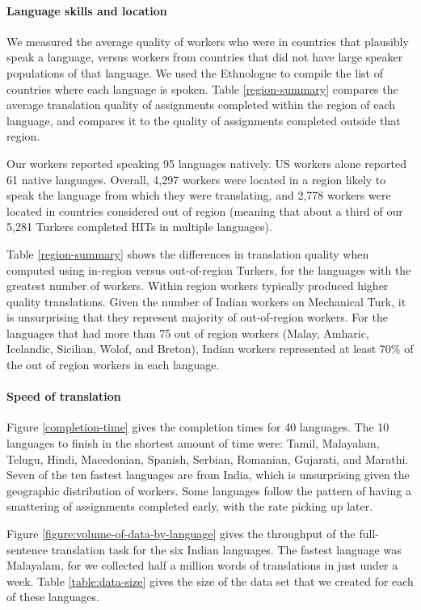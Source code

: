 \documentclass[11pt]{article}
\begin{document}
\paragraph{Language skills and location}

We measured the average quality of workers who were in countries that plausibly speak a language, versus workers from countries that did not have large speaker populations of that language.  We used the Ethnologue \cite{ethnologue} to compile the list of countries where each language is spoken.  Table \ref{region-summary} compares the average translation quality of assignments completed within the region of each language, and compares it to the quality of assignments completed outside that region. 

Our workers reported speaking 95 languages natively. US workers alone reported 61 native languages. Overall, 4,297 workers were located in a region likely to speak the language from which they were translating, and 2,778 workers were located in countries considered out of region (meaning that about a third of our 5,281 Turkers completed HITs in multiple languages). 

Table \ref{region-summary} shows the differences in translation quality when computed using in-region versus out-of-region Turkers, for the languages with the greatest number of workers.  Within region workers typically produced higher quality translations. 
Given the number of Indian workers on Mechanical Turk, it is unsurprising that they represent majority of out-of-region workers.  For the languages that had more than 75 out of region workers (Malay, Amharic, Icelandic, Sicilian, Wolof, and Breton), Indian workers represented at least 70\% of the out of region workers in each language. 


\paragraph{Speed of translation}


Figure \ref{completion-time} gives the completion times for 40 languages.  
The 10 languages to finish in the shortest amount of time were: Tamil, Malayalam, Telugu, Hindi, Macedonian, Spanish, Serbian, Romanian, Gujarati, and Marathi. Seven of the ten fastest languages are from India, which is unsurprising given the geographic distribution of workers.  Some languages follow the pattern of having a smattering of assignments completed early, with the rate picking up later. 

Figure \ref{figure:volume-of-data-by-language} gives the throughput of the full-sentence translation task for the six Indian languages.  The fastest language was Malayalam, for we collected half a million words of translations in just under a week.  Table \ref{table:data-size} gives the size of the data set that we created for each of these languages. 
\end{document}
